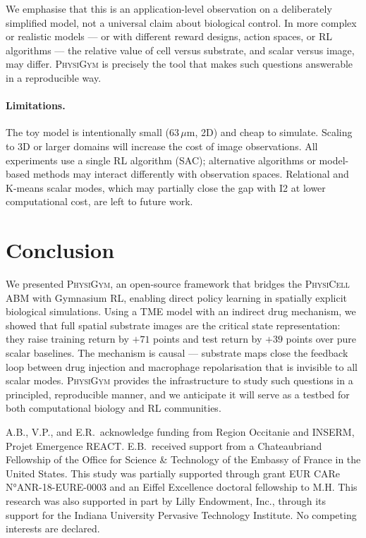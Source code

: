 \documentclass{article}
\newcommand{\physigym}{\textsc{PhysiGym}}
\newcommand{\physicell}{\textsc{PhysiCell}}
\begin{document}
We emphasise that this is an application-level observation on a deliberately
simplified model, not a universal claim about biological control. In more
complex or realistic models — or with different reward designs, action spaces,
or RL algorithms — the relative value of cell versus substrate, and scalar
versus image, may differ. \physigym{} is precisely the tool that makes such
questions answerable in a reproducible way.

\paragraph{Limitations.}
The toy model is intentionally small (63\,$\mu$m, 2D) and cheap to simulate.
Scaling to 3D or larger domains will increase the cost of image observations.
All experiments use a single RL algorithm (SAC); alternative algorithms or
model-based methods may interact differently with observation spaces.
Relational and K-means scalar modes, which may partially close the gap with I2
at lower computational cost, are left to future work.

\section{Conclusion}

We presented \physigym{}, an open-source framework that bridges the
\physicell{} ABM with Gymnasium RL, enabling direct policy learning in
spatially explicit biological simulations.
Using a TME model with an indirect drug mechanism, we showed that full
spatial substrate images are the critical state representation: they raise
training return by $+71$ points and test return by $+39$ points over pure
scalar baselines.
The mechanism is causal — substrate maps close the feedback loop between drug
injection and macrophage repolarisation that is invisible to all scalar modes.
\physigym{} provides the infrastructure to study such questions in a
principled, reproducible manner, and we anticipate it will serve as a
testbed for both computational biology and RL communities.

\begin{ack}
A.B., V.P., and E.R.\ acknowledge funding from Region Occitanie and INSERM,
Projet Emergence REACT.
E.B.\ received support from a Chateaubriand Fellowship of the Office for
Science \& Technology of the Embassy of France in the United States.
This study was partially supported through grant EUR CARe N°ANR-18-EURE-0003
and an Eiffel Excellence doctoral fellowship to M.H.
This research was also supported in part by Lilly Endowment, Inc., through its
support for the Indiana University Pervasive Technology Institute.
No competing interests are declared.
\end{ack}
\end{document}
